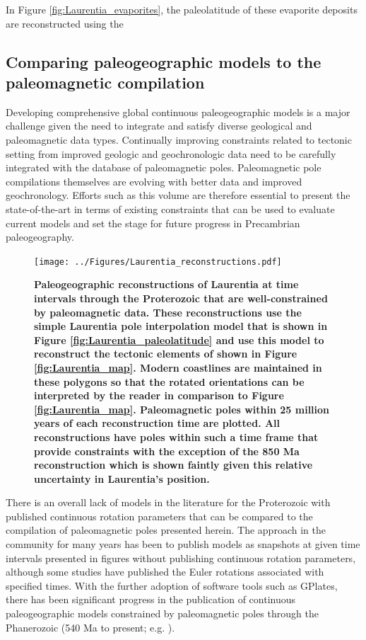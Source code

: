 \documentclass[11pt,letterpaper]{article}
\begin{document}
In Figure \ref{fig:Laurentia_evaporites}, the paleolatitude of these evaporite deposits are reconstructed using the

\subsection{Comparing paleogeographic models to the paleomagnetic compilation}

Developing comprehensive global continuous paleogeographic models is a major challenge given the need to integrate and satisfy diverse geological and paleomagnetic data types. Continually improving constraints related to tectonic setting from improved geologic and geochronologic data need to be carefully integrated with the database of paleomagnetic poles. Paleomagnetic pole compilations themselves are evolving with better data and improved geochronology. Efforts such as this volume are therefore essential to present the state-of-the-art in terms of existing constraints that can be used to evaluate current models and set the stage for future progress in Precambrian paleogeography.

\begin{figure}
\centering
\texttt{[image: ../Figures/Laurentia\_reconstructions.pdf]}
\caption{\small{\textbf{Paleogeographic reconstructions of Laurentia at time intervals through the Proterozoic that are well-constrained by paleomagnetic data. These reconstructions use the simple Laurentia pole interpolation model that is shown in Figure \ref{fig:Laurentia_paleolatitude} and use this model to reconstruct the tectonic elements of \cite{Whitmeyer2007a} shown in Figure \ref{fig:Laurentia_map}. Modern coastlines are maintained in these polygons so that the rotated orientations can be interpreted by the reader in comparison to Figure \ref{fig:Laurentia_map}. Paleomagnetic poles within 25 million years of each reconstruction time are plotted. All reconstructions have poles within such a time frame that provide constraints with the exception of the 850 Ma reconstruction which is shown faintly given this relative uncertainty in Laurentia's position.}}}
\label{fig:Laurentia_reconstructions}
\end{figure}

There is an overall lack of models in the literature for the Proterozoic with published continuous rotation parameters that can be compared to the compilation of paleomagnetic poles presented herein. The approach in the community for many years has been to publish models as snapshots at given time intervals presented in figures without publishing continuous rotation parameters, although some studies have published the Euler rotations associated with specified times. With the further adoption of software tools such as GPlates, there has been significant progress in the publication of continuous paleogeographic models constrained by paleomagnetic poles through the Phanerozoic (540 Ma to present; e.g. \citealp{Torsvik2012a}).
\end{document}
